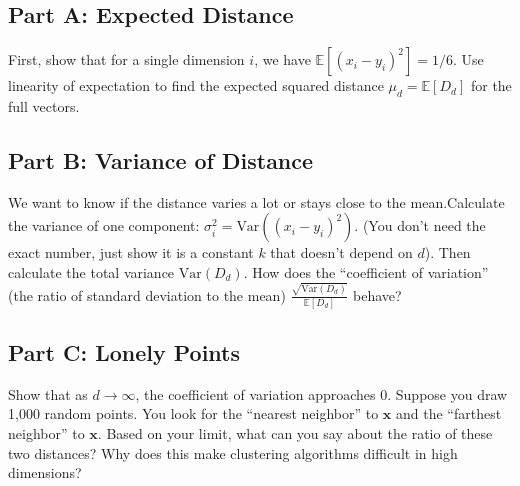 \documentclass{article}
\begin{document}
\hypertarget{part-a-expected-distance}{%
\subsection*{Part A: Expected Distance}\label{part-a-expected-distance}}

First, show that for a single dimension \(i\), we have \(\mathbb{E}[(x_i - y_i)^2] = 1/6\). Use linearity of expectation to find the expected squared distance \(\mu_d = \mathbb{E}[D_d]\) for the full vectors.

\hypertarget{part-b-variance-of-distance}{%
\subsection*{Part B: Variance of Distance}\label{part-b-variance-of-distance}}

We want to know if the distance varies a lot or stays close to the mean.Calculate the variance of one component: \(\sigma_i^2 = \text{Var}((x_i - y_i)^2)\). (You don't need the exact number, just show it is a constant \(k\) that doesn't depend on \(d\)). Then calculate the total variance \(\text{Var}(D_d)\). How does the ``coefficient of variation'' (the ratio of standard deviation to the mean) \(\frac{\sqrt{\text{Var}(D_d)}}{\mathbb{E}[D_d]}\) behave?

\hypertarget{part-c-lonely-points}{%
\subsection*{Part C: Lonely Points}\label{part-c-lonely-points}}

Show that as \(d \to \infty\), the coefficient of variation approaches 0. Suppose you draw 1,000 random points. You look for the ``nearest neighbor'' to \(\mathbf{x}\) and the ``farthest neighbor'' to \(\mathbf{x}\). Based on your limit, what can you say about the ratio of these two distances? Why does this make clustering algorithms difficult in high dimensions?
\end{document}
